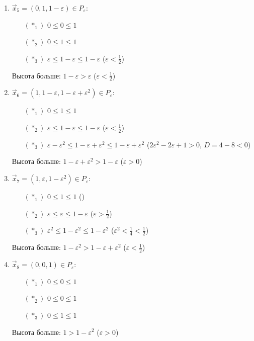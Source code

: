 \documentclass[a4paper]{article}
\def\eps{\varepsilon}
\begin{document}
\begin{enumerate}
\item $\vec{x}_5=(0,1,1-\eps)\in P_\eps$:\begin{enumerate}
\item[$(*_1)$] $0\leqslant 0 \leqslant 1$
\item[$(*_2)$] $0 \leqslant 1 \leqslant 1$
\item[$(*_3)$] $\eps \leqslant 1-\eps \leqslant 1-\eps$ ($\eps<\frac{1}{2}$)
\end{enumerate}
Высота больше: $1-\eps>\eps$ ($\eps<\frac{1}{2}$)

\item $\vec{x}_6=(1,1-\eps,1-\eps+\eps^2)\in P_\eps$:\begin{enumerate}
\item[$(*_1)$] $0\leqslant 1 \leqslant 1$
\item[$(*_2)$] $\eps \leqslant 1-\eps \leqslant 1-\eps$ ($\eps<\frac{1}{2} $)
\item[$(*_3)$] $\eps-\eps^2 \leqslant 1-\eps+\eps^2 \leqslant 1-\eps+\eps^2$ ($2\eps^2-2\eps+1>0,\,D=4-8<0$)
\end{enumerate}
Высота больше: $1-\eps+\eps^2>1-\eps$ ($\eps>0$)

\item $\vec{x}_7=(1,\eps,1-\eps^2)\in P_\eps$:\begin{enumerate}
\item[$(*_1)$] $0\leqslant 1 \leqslant 1$ ($ $)
\item[$(*_2)$] $\eps \leqslant \eps \leqslant 1-\eps$ ($\eps>\frac{1}{2} $)
\item[$(*_3)$] $\eps^2 \leqslant 1-\eps^2 \leqslant 1-\eps^2$ ($\eps^2<\frac{1}{4}<\frac{1}{2} $)
\end{enumerate}
Высота больше: $1-\eps^2>1-\eps+\eps^2$ ($\eps<\frac{1}{2}$)

\item $\vec{x}_8=(0,0,1)\in P_\eps$:\begin{enumerate}
\item[$(*_1)$] $0\leqslant 0 \leqslant 1$
\item[$(*_2)$] $0\leqslant 0 \leqslant 1$
\item[$(*_3)$] $0\leqslant 1 \leqslant 1$
\end{enumerate}
Высота больше: $1>1-\eps^2$ ($\eps>0$)

\end{enumerate}
\end{document}
